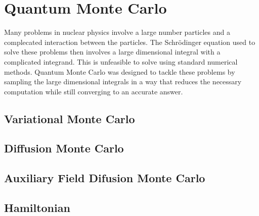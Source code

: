 \section{Quantum Monte Carlo}
Many problems in nuclear physics involve a large number particles and a complecated interaction between the particles. The Schr\"odinger equation used to solve these problems then involves a large dimensional integral with a complicated integrand. This is unfeasible to solve using standard numerical methods. Quantum Monte Carlo was designed to tackle these problems by sampling the large dimensional integrals in a way that reduces the necessary computation while still converging to an accurate answer.

\subsection{Variational Monte Carlo}

\subsection{Diffusion Monte Carlo}

\subsection{Auxiliary Field Difusion Monte Carlo}

\subsubsection{}

\subsection{Hamiltonian}
